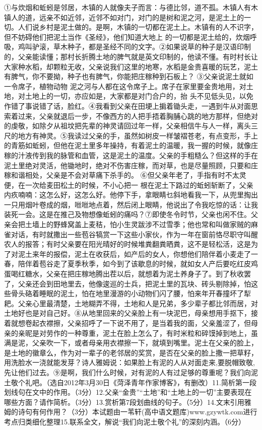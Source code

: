 \documentclass[zihao = -4]{exam-zh}
\begin{document}
       \begin{material}[
         title = 比邻而居
, author = 耿立
,
       ]

       ①与炊烟和蚯蚓是邻居，木镇的人就像夫子而言：与德比邻，道不孤。木镇人有木镇人的道，远亲不如近邻，近邻不如对门，对门的是树和泥之河，是泥土上的一切。人们说乡村是泥土做的。是啊，木镇的一切都在泥土上。木镇有的人不识字，但不妨碍他们把泥土当作《圣经》，他们知道大地上 的一切都是泥土给的，炊烟呼吸，鸡叫驴滚，草木种子，都是圣经不同的文字。②如果说草的种子是汉语印制的，父亲能读懂；那村长折腾土地的脾气就是英文印制的，他读不懂。有时村长让大家种水稻，却颗粒无收，父亲说我们这里的地寒，水稻是金贵喜暖的玩艺，泥土有脾气，你不要拗，种子也有脾气，你能把庄稼种到石板上？ ③父亲说泥土就如一令席子，植物动物 泥之河与人都在这令席子上。席子在家里要金贵地用，对土地，对土地上的一切，亦应如是，大家都是对门合户的，抬 头不见低头见，以免作错了事说错了话，脸红。④我看到父亲在田埂上掮着锄头走，一遇到牛从对面思索着过来，父亲就退后一步，不像西方的人把手捂着胸脯心跳的地方那样，但绝对的虔敬，如除夕从祖坟把先辈的神灵请回过年一样，父亲相信牛与人一样，离头三尺的地方有神灵。⑤我读过父亲的手，虽然如树皮一样皱褶苍老，有点变形，手上的青筋如蚯蚓，但他在泥土里多年操持，有着泥土的温暖，我一握的时候，就像庄稼的汁液传到我的脉管和血管，这是泥土的温度。父亲的手粗糙么？但这样的手在泥土里绝对灵活，他锄地时，绝对不伤害庄稼，而对草，也是尽量照顾，只要和庄稼和谐相处，父亲是不会对草痛下杀手的。    ⑥但父亲年老了，手指有时不太灵便，在一次给麦田松土的时候，不小心把一 根在泥土下路过的蚯蚓斩断了，父亲内疚喃喃：这怎么好，这怎么好。他停下手，拿眼睛乜斜地看我一下，从兜里掏出一只用烟叶卷成的烟，咝咝地点着，然后闭上眼睛，他说出了令我吃惊的话：让我装死一会。这是在推己及物想像蚯蚓的痛吗？⑦即使冬令时节，父亲也闲不住。父亲会把土墙上的野蜂窝盖上麦秸，怕小生灵跋涉不过雪季；他也常和叫做家贼的麻雀对话，有时就撒出一些苞谷犒赏一下这些小家伙，作为一年在窗前恪尽职守叫醒农人的报答；有时父亲要在阳光晴好的时候堆粪翻粪晒粪，这不是轻松活，这是为了对泥土来年的报偿，泥土在收获后，如产后的女人，你想他们陪伴着小麦走了一春，陪伴着苞谷走了夏季秋季，如今到了该歇息的时候，就如女人产后要吃红皮鸡蛋喝红糖水，父亲在把庄稼地腾出茬以后，就想着为泥土养身子了。到了秋收罢了，父亲还会到田地里去，他像逡巡的士兵，把泥土里的瓦块、砖头剔除掉，怕这些骨头硌着睡眠的泥土，怕在地里漫游的小动物们闪了腰，怕来年开春撞坏了犁耙。父亲心里最清楚，土地糊弄不得，土地和人是兄弟，多少辈子都比邻而居，对土地好也是对自己好。⑧从地里回来的父亲脸上有一块泥巴，母亲想用手抠下，接着就想卷起衣襟擦，父亲招呼了一下说不用了，是当着我的面，父亲羞涩了，但母亲的亲昵是对劳作的一种尊重，泥土在脸上怎么了，有时米粒和碎馍掉到地上，虽满是泥，父亲吹一下，或者母亲用衣襟擦一下，就填到嘴里。泥土在父亲的脸上，是土地的徽章么，作为对一辈子的老邻居的奖赏，是否在父亲的脸上撒一把草籽，用洗脸水一浇就能发芽？诗人雅姆说：如果脸上有泥的人从对面走来,要脱帽致敬,先让他们过去。⑨是啊，我们什么时候，对有泥的人有过足够的尊重呢？我们向泥土敬个礼吧。（选自2012年3月30日《菏泽青年作家博客》，有删改）11.简析第一段划线句在文中的作用。（3分）12.父亲“金贵”“土地”和“土地上的一切”主要表现在哪些方面？请作简析。（3分）13.赏析第7段划曲线的句子。（5分）14.文末引用雅姆的诗句有何作用？（3分）本试题由一苇轩(高中语文题库)www.gzywtk.com进行考点归类细化整理15.联系全文，解说“我们向泥土敬个礼”的深刻内涵。（6分）
\\
       \end{material}
\end{document}
